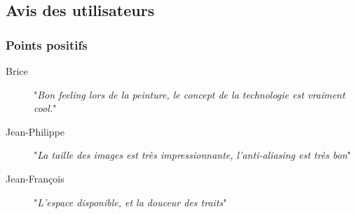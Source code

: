 	\subsection{Avis des utilisateurs}
		\subsubsection{Points positifs}
			\begin{description}
				\item[Brice] "\emph{Bon feeling lors de la peinture, le concept de la technologie est vraiment cool.}"
				\item[Jean-Philippe] "\emph{La taille des images est très impressionnante, l'anti-aliasing est très bon}"
				\item[Jean-François] "\emph{L'espace disponible, et la douceur des traits}"
			\end{description}
